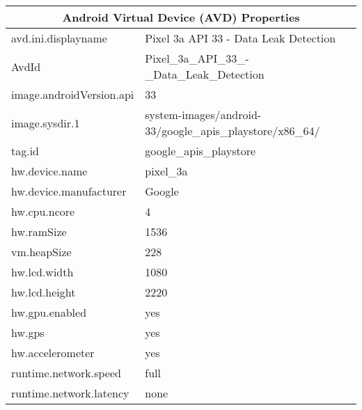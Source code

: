 			\begin{center}
				\begin{tabular}{ |p{5cm}||p{9cm}| }
					 \hline
					 \multicolumn{2}{|c|}{Android Virtual Device (AVD) Properties} \\
					 \hline
					 \hline
					 avd.ini.displayname & Pixel 3a API 33 - Data Leak Detection \\
					 AvdId & Pixel\_3a\_API\_33\_-\_Data\_Leak\_Detection \\
					 image.androidVersion.api & 33 \\
					 image.sysdir.1 & system-images/android-33/google\_apis\_playstore/x86\_64/ \\
					 tag.id & google\_apis\_playstore \\
					 hw.device.name & pixel\_3a \\
					 hw.device.manufacturer & Google \\
					 hw.cpu.ncore & 4 \\
					 hw.ramSize & 1536 \\
					 vm.heapSize & 228 \\
					 hw.lcd.width & 1080 \\
					 hw.lcd.height & 2220 \\
					 hw.gpu.enabled & yes \\
					 hw.gps & yes \\					 
					 hw.accelerometer & yes \\
					 runtime.network.speed & full\\
					 runtime.network.latency & none \\
					 \hline
				\end{tabular}
			\end{center}

			

